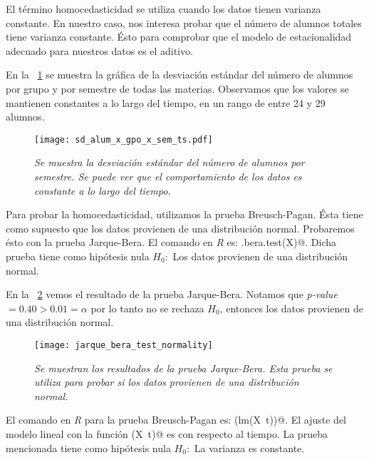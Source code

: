 El término homocedasticidad se utiliza cuando los datos tienen varianza constante. En nuestro caso, nos interesa probar que el número de alumnos totales tiene varianza constante. Ésto para comprobar que el modelo de estacionalidad adecuado para nuestros datos es el aditivo.

En la \figurename{~\ref{sd_alum_x_gpo_x_sem_ts}} se muestra la gráfica de la desviación estándar del número de alumnos por grupo y por semestre de todas las materias. Observamos que los valores se mantienen constantes a lo largo del tiempo, en un rango de entre 24 y 29 alumnos.


\begin{figure}[H]
\centering
\texttt{[image: sd\_alum\_x\_gpo\_x\_sem\_ts.pdf]} %
\caption[\textit{Desviación estándar del número de alumnos por semestre}]{\textit{Se muestra la desviación estándar del número de alumnos por semestre. Se puede ver que el comportamiento de los datos es constante a lo largo del tiempo.}}\label{sd_alum_x_gpo_x_sem_ts}
\end{figure}


Para probar la homocedasticidad, utilizamos la prueba Breusch-Pagan. Ésta tiene como supuesto que los datos provienen de una distribución normal. Probaremos ésto con la prueba Jarque-Bera. El comando en \textit{R} es: \verb@jarque.bera.test(X)@. Dicha prueba tiene como hipótesis nula $H_{0}:$ Los datos provienen de una distribución normal.

En la \figurename{~\ref{JarqueBeraTest_normality}} vemos el resultado de la prueba Jarque-Bera. Notamos que \textit{p-value} $ = 0.40 > 0.01 = \alpha$ por lo tanto no se rechaza $H_{0}$, entonces los datos provienen de una distribución normal.

\begin{figure}[H]
\centering
\texttt{[image: jarque\_bera\_test\_normality]} %
\caption[\textit{Prueba Jarque-Bera para normalidad}]{\textit{Se muestran los resultados de la prueba Jarque-Bera. Esta prueba se utiliza para probar si los datos provienen de una distribución normal.}}\label{JarqueBeraTest_normality}
\end{figure}


El comando en \textit{R} para la prueba Breusch-Pagan es: \verb@bptest(lm(X~t))@. El ajuste del modelo lineal con la función \verb@lm(X~t)@ es con respecto al tiempo. La prueba mencionada tiene como hipótesis nula $H_{0}:$ La varianza es constante.


